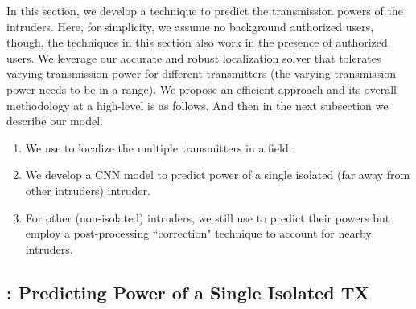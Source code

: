 In this section, we develop a technique to predict the transmission powers of the intruders. Here, for simplicity, we assume no background authorized users, though, the techniques in this section also work in the presence of authorized users. 
We leverage our accurate and robust localization solver that tolerates varying transmission power for different transmitters (the varying transmission power needs to be in a range).
We propose an efficient approach and its overall methodology at a high-level is as follows.
And then in the next subsection we describe our \power model.
\begin{enumerate}
\item We use \our to localize the multiple transmitters in a field. 
\item We develop a CNN model \power to predict power of a single isolated (far away from other intruders) intruder. 
\item For other (non-isolated) intruders, we still use \power to predict their powers but employ a post-processing ``correction" technique to account for nearby intruders. 
\end{enumerate}


\subsection{\bf \power: Predicting Power of a Single Isolated TX}
\label{subsec:in-out-design}

